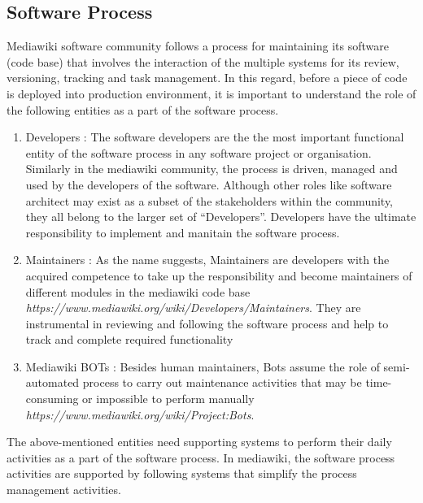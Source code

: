 \subsection{Software Process}
\indent Mediawiki software community follows a process for maintaining its software (code base) that involves the interaction of the multiple systems for its review, versioning, tracking and task management. In this regard, before a piece of code is deployed into production environment, it is important to understand the role of the following entities as a part of the software process. 
\begin{enumerate}
\item Developers : The software developers are the the most important functional entity of the software process in any software project or organisation. Similarly in the mediawiki community, the process is driven, managed and used by the developers of the software. Although other roles like software architect may exist as a subset of the stakeholders within the community, they all belong to the larger set of \enquote{Developers}. Developers have the ultimate responsibility to implement and manitain the software process.
\item Maintainers : As the name suggests, Maintainers are developers with the acquired competence to take up the responsibility and become maintainers of different modules in the mediawiki code base \emph{https://www.mediawiki.org/wiki/Developers/Maintainers}. They are instrumental in reviewing and following the software process and help to track and complete required functionality
\item Mediawiki BOTs : Besides human maintainers, Bots assume the role of semi-automated process to carry out maintenance activities that may be time-consuming or impossible to perform manually \emph{https://www.mediawiki.org/wiki/Project:Bots}.
\end{enumerate}
\indent The above-mentioned entities need supporting systems to perform their daily activities as a part of the software process. In mediawiki, the software process activities are supported by following systems that simplify the process management  activities. 
